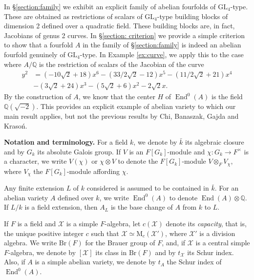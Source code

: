 \documentclass[oneside]{amsart}
\theoremstyle{remark}
\newcommand{\Q}{\mathbb Q}
\newcommand{\kbar}{{\bar{k}}}
\newcommand{\GL}{\mathrm{GL}}
\newcommand{\M}{\mathrm{M }}
\newcommand{\End}{\operatorname{End}}
\newcommand{\Br}{\mathrm{Br}}
\newcommand{\cX}{\mathcal X}
\numberwithin{equation}{section}
\begin{document}
In \S\ref{section:family} we exhibit an explicit family of abelian fourfolds of $\GL_4$-type. These are obtained as restrictions of scalars of $\GL_4$-type building blocks of dimension 2 defined over a quadratic field. These building blocks are, in fact, Jacobians of genus 2 curves. In \S\ref{section: criterion} we provide a simple criterion to show that a fourfold $A$ in the family of \S\ref{section:family} is indeed an abelian fourfold genuinely of $\GL_4$-type. In Example \ref{ex:curve}, we apply this to the case where $A/\Q$ is the restriction of scalars of the Jacobian of the curve
   \begin{align*}
 y^2 &= (-10{\sqrt{2}} + 18)x^6 - (33/2{\sqrt{2}} - 12)x^5 - (11/2{\sqrt{2}} + 21)x^4\\ &- (3{\sqrt{2}} + 24)x^3 - (5{\sqrt{2}} + 6)x^2 - 2{\sqrt{2}}x.
\end{align*}
By the construction of $A$, we know that the center $H$ of $\End^0(A)$ is the field $\Q(\sqrt{-2})$. This provides an explicit example of abelian variety to which our main result applies, but not the previous results by Chi, Banaszak, Gajda and Kraso\'n. 

\textbf{Notation and terminology.} For a field $k$, we denote by $\kbar$ its algebraic closure and by $G_k$ its absolute Galois group. If $V$ is an $F[G_k]$-module and $\chi:G_k\rightarrow F^\times$ is a character, we write $V(\chi)$ or $\chi \otimes V$ to denote the $F[G_k]$-module $V\otimes_F V_\chi$, where $V_\chi$ the $F[G_k]$-module affording $\chi$. 

Any finite extension $L$ of $k$ considered is assumed to be contained in $\kbar$. For an abelian variety $A$ defined over $k$, we write $\End^0(A)$ to denote $\End(A)\otimes \Q$. If $L/k$ is a field extension, then $A_L$ is the base change of $A$ from $k$ to $L$. 

If $F$ is a field and $\cX$ is a simple $F$-algebra, let $c(\cX)$ denote its  \emph{capacity}, that is, the unique positive integer $c$ such that $\cX\simeq \M_c(\cX')$, where $\cX'$ is a division algebra. We write $\Br(F)$ for the Brauer group of $F$, and, if $\cX$ is a central simple $F$-algebra, we denote by $[\cX]$ its class in $\Br(F)$ and by $t_\cX$ its Schur index. Also, if $A$ is a simple abelian variety, we denote by $t_A$ the Schur index of $\End^0(A)$. 
\end{document}
